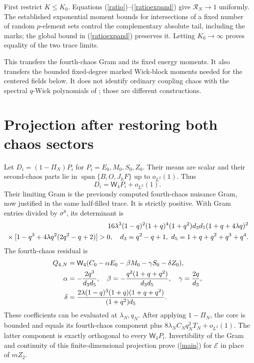 \documentclass[11pt,a4paper]{article}
\newcommand{\W}[1]{\mathsf W_{#1}}
\newcommand{\core}{\mathcal E}
\begin{document}
First restrict $K\leq K_0$. Equations (\ref{ratio})--(\ref{ratioexpand})
give $\mathcal R_N\to1$ uniformly. The established exponential
moment bounds for intersections of a fixed number of random
$p$-element sets control the complementary absolute tail, including
the marks; the global bound in (\ref{ratioexpand}) preserves it.
Letting $K_0\to\infty$ proves equality of the two trace limits.

This transfers the fourth-chaos Gram and its fixed energy moments.
It also transfers the bounded fixed-degree marked Wick-block
moments needed for the centered fields below. It does not identify
ordinary coupling chaos with the spectral $q$-Wick polynomials of
\cite{tt}; those are different constructions.

\newpage
\section{Projection after restoring both chaos sectors}
Let $D_i=(1-\Pi_N)P_i$ for $P_i=E_0,M_0,S_0,Z_0$.
Their means are scalar and their second-chaos parts lie in
$\operatorname{span}\{B,O,J_hF\}$ up to $o_{L^2}(1)$. Thus
\begin{equation}
 D_i=\W4P_i+o_{L^2}(1).
\end{equation}
Their limiting Gram is the previously computed fourth-chaos
nuisance Gram, now justified in the same half-filled trace.
It is strictly positive. With Gram entries divided by $\sigma^8$,
its determinant is
\begin{align}
 16\lambda^3(1-q)^2(1+q)^4(1+q^2)d_3d_5
 (1+q+4\lambda q)^2\notag\\
 {}\times[1-q^3+4\lambda q^2(2q^2-q+2)]>0,\quad
 d_3=q^2-q+1,\ d_5=1+q+q^2+q^3+q^4.\label{det}
\end{align}
The fourth-chaos residual is
\begin{align}
 Q_{4,N}&=\W4(C_0-\alpha E_0-\beta M_0-\gamma S_0-\delta Z_0),\\
 \alpha&=-\frac{2q^3}{d_3d_5},\quad
 \beta=-\frac{q^2(1+q+q^2)}{d_3d_5},\quad\gamma=\frac{2q}{d_3},\notag\\
 \delta&=\frac{2\lambda(1-q)^3(1+q)(1+q+q^2)}{(1+q^2)d_5}.\notag
\end{align}
These coefficients can be evaluated at $\lambda_N,q_N$.
After applying $1-\Pi_N$, the core is bounded and equals its
fourth-chaos component plus $8\lambda_N C_Nq_N^2T_N+o_{L^2}(1)$.
The latter component is exactly orthogonal to every $\W4P_i$.
Invertibility of the Gram and continuity of this finite-dimensional
projection prove (\ref{main}) for $\core$ in place of $mZ_2$.
\end{document}
